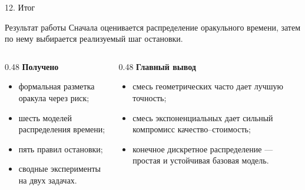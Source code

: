 \documentclass[aspectratio=169,11pt]{beamer}
\begin{document}
\begin{frame}{12. Итог}
\begin{block}{Результат работы}
Сначала оценивается распределение оракульного времени, затем по нему выбирается реализуемый шаг
остановки.
\end{block}

\vspace{2mm}
\begin{columns}[T,onlytextwidth]
\begin{column}{0.48\textwidth}
\textbf{Получено}
\begin{itemize}\setlength\itemsep{1.5mm}
\item формальная разметка оракула через риск;
\item шесть моделей распределения времени;
\item пять правил остановки;
\item сводные эксперименты на двух задачах.
\end{itemize}
\end{column}
\begin{column}{0.48\textwidth}
\textbf{Главный вывод}
\begin{itemize}\setlength\itemsep{1.5mm}
\item смесь геометрических часто дает лучшую точность;
\item смесь экспоненциальных дает сильный компромисс качество--стоимость;
\item конечное дискретное распределение — простая и устойчивая базовая модель.
\end{itemize}
\end{column}
\end{columns}
\end{frame}
\end{document}
